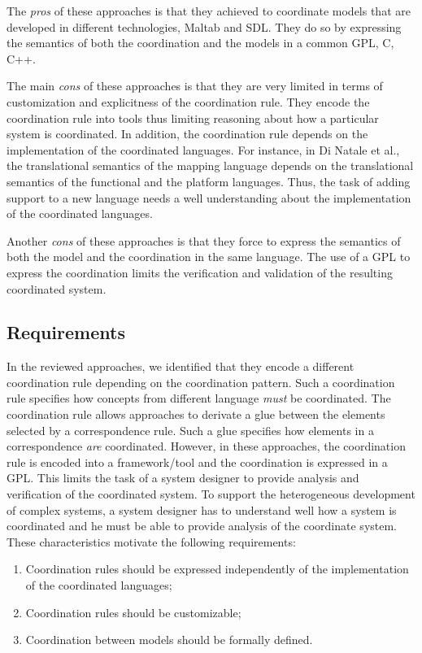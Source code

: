 The \emph{pros} of these approaches is that they achieved to coordinate models that are developed in different technologies, \ie Maltab and SDL. They do so by expressing the semantics of both the coordination and the models in a common GPL, \ie C, C++. 

The main \emph{cons} of these approaches is that they are very limited in terms of customization and explicitness of the coordination rule. They encode the coordination rule into tools thus limiting reasoning about how a particular system is coordinated. In addition, the coordination rule depends on the implementation of the coordinated languages. For instance, in Di Natale et al., the translational semantics of the mapping language depends on the translational semantics of the functional and the platform languages. Thus, the task of adding support to a new language needs a well understanding about the implementation of the coordinated languages.

Another \emph{cons} of these approaches is that they force to express the semantics of both the model and the coordination in the same language. The use of a GPL to express the coordination limits the verification and validation of the resulting coordinated system. 
	
\subsection{Requirements}
In the reviewed approaches, we identified that they encode a different coordination rule depending on the coordination pattern. Such a coordination rule specifies how concepts from different language \emph{must} be coordinated. The coordination rule allows approaches to derivate a glue between the elements selected by a correspondence rule. Such a glue specifies how elements in a correspondence \emph{are} coordinated. However, in these approaches, the coordination rule is encoded into a framework/tool and the coordination is expressed in a GPL. This limits the task of a system designer to provide analysis and verification of the coordinated system. To support the heterogeneous development of complex systems, a system designer has to understand well how a system is coordinated and he must be able to provide analysis of the coordinate system. These characteristics motivate the following requirements:
	\begin{enumerate}
		\item Coordination rules should be expressed independently of the implementation of the coordinated languages;  
		\item Coordination rules should be customizable;
		\item Coordination between models should be formally defined. 
	\end{enumerate}
	
